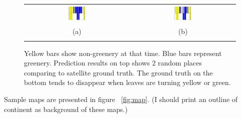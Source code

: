 \begin{figure}
\begin{center}
\begin{tabular}{c c}
\includegraphics[width=0.22\textwidth]{bar1.jpg} &
\includegraphics[width=0.22\textwidth]{bar2.jpg} \\
(a) & (b)\\
\\
\end{tabular}
\end{center}
\vspace{-24pt}
\caption{Yellow bars show non-greenery at that time. Blue bars represent greenery. Prediction results on top shows 2 random places comparing to satellite ground truth. The ground truth on the bottom tends to disappear when leaves are turning yellow or green.}
\label{fig:placeinbar}
\vspace{-12pt}
\end{figure}


Sample maps are presented in figure ~\ref{fig:map}. (I should print an outline of continent as background of these maps.)

